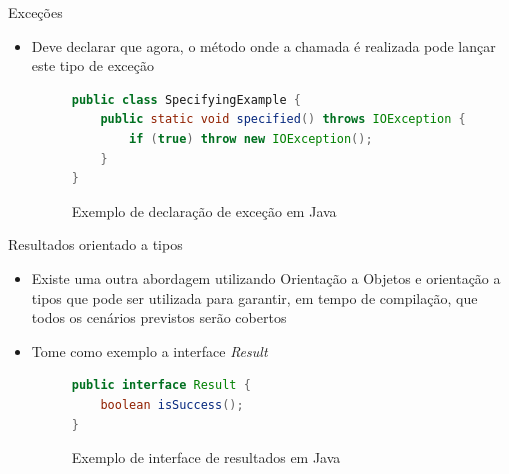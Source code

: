 \documentclass[brazilian]{beamer}
\begin{document}
\begin{frame}[fragile]{Exceções}
    \begin{itemize}
        \item Deve declarar que agora, o método onde a chamada é realizada pode lançar este tipo de exceção
        \begin{figure}[H]
            \centering
            \begin{lstlisting}[language=Java]
public class SpecifyingExample {
    public static void specified() throws IOException {
        if (true) throw new IOException();
    }
}
            \end{lstlisting}
            \caption{Exemplo de declaração de exceção em Java}
            \label{fig:java_declaring_exception}
        \end{figure}
    \end{itemize}
\end{frame}

\begin{frame}[fragile]{Resultados orientado a tipos}
    \begin{itemize}
        \item Existe uma outra abordagem utilizando Orientação a Objetos e orientação a tipos que pode ser utilizada para garantir, em tempo de compilação, que todos os cenários previstos serão cobertos
        \item Tome como exemplo a interface \emph{Result}
        \begin{figure}[H]
            \centering
            \begin{lstlisting}[language=Java]
public interface Result {
    boolean isSuccess();
}
            \end{lstlisting}
            \caption{Exemplo de interface de resultados em Java}
            \label{fig:java_result_interface}
        \end{figure}
    \end{itemize}
\end{frame}
\end{document}
